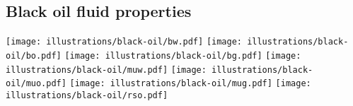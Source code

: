 
\subsection{Black oil fluid properties} %
\label{sub:black_oil_fluid_properties}

\begin{center}
    \texttt{[image: illustrations/black-oil/bw.pdf]}
    \texttt{[image: illustrations/black-oil/bo.pdf]}
    \texttt{[image: illustrations/black-oil/bg.pdf]}
    \texttt{[image: illustrations/black-oil/muw.pdf]}
    \texttt{[image: illustrations/black-oil/muo.pdf]}
    \texttt{[image: illustrations/black-oil/mug.pdf]}
    \texttt{[image: illustrations/black-oil/rso.pdf]}
\end{center}


